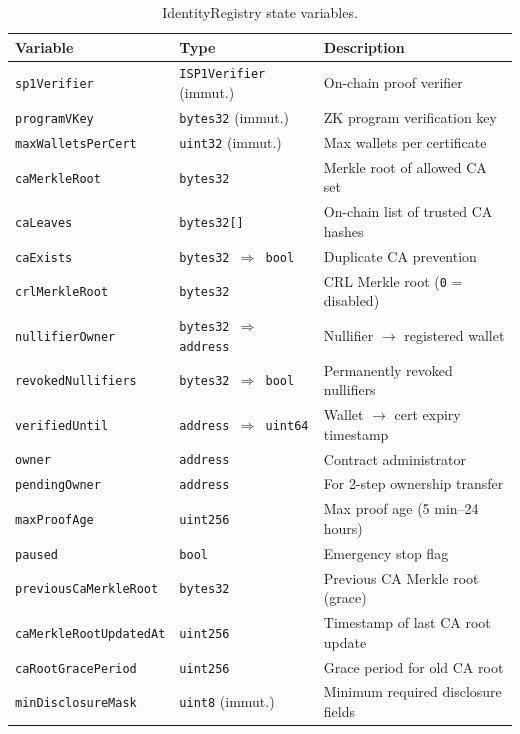 \documentclass[11pt, a4paper]{article}
\begin{document}
\begin{table}[ht]
\centering
\small
\caption{IdentityRegistry state variables.}
\label{tab:state-variables}
\begin{tabular}{@{}lll@{}}
\toprule
Variable & Type & Description \\
\midrule
\texttt{sp1Verifier} & \texttt{ISP1Verifier} (immut.) & On-chain proof verifier \\
\texttt{programVKey} & \texttt{bytes32} (immut.) & ZK program verification key \\
\texttt{maxWalletsPerCert} & \texttt{uint32} (immut.) & Max wallets per certificate \\
\texttt{caMerkleRoot} & \texttt{bytes32} & Merkle root of allowed CA set \\
\texttt{caLeaves} & \texttt{bytes32[]} & On-chain list of trusted CA hashes \\
\texttt{caExists} & \texttt{bytes32 $\Rightarrow$ bool} & Duplicate CA prevention \\
\texttt{crlMerkleRoot} & \texttt{bytes32} & CRL Merkle root (\texttt{0} = disabled) \\
\texttt{nullifierOwner} & \texttt{bytes32 $\Rightarrow$ address} & Nullifier $\rightarrow$ registered wallet \\
\texttt{revokedNullifiers} & \texttt{bytes32 $\Rightarrow$ bool} & Permanently revoked nullifiers \\
\texttt{verifiedUntil} & \texttt{address $\Rightarrow$ uint64} & Wallet $\rightarrow$ cert expiry timestamp \\
\texttt{owner} & \texttt{address} & Contract administrator \\
\texttt{pendingOwner} & \texttt{address} & For 2-step ownership transfer \\
\texttt{maxProofAge} & \texttt{uint256} & Max proof age (5 min--24 hours) \\
\texttt{paused} & \texttt{bool} & Emergency stop flag \\
\texttt{previousCaMerkleRoot} & \texttt{bytes32} & Previous CA Merkle root (grace) \\
\texttt{caMerkleRootUpdatedAt} & \texttt{uint256} & Timestamp of last CA root update \\
\texttt{caRootGracePeriod} & \texttt{uint256} & Grace period for old CA root \\
\texttt{minDisclosureMask} & \texttt{uint8} (immut.) & Minimum required disclosure fields \\
\bottomrule
\end{tabular}
\end{table}
\end{document}
